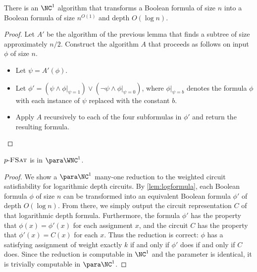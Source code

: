 
\begin{lemma}\label{lem:logformula}
  There is an $\NC^1$ algorithm that transforms a Boolean formula of size $n$ into a Boolean formula of size $n^{O(1)}$ and depth $O(\log n)$.
\end{lemma}
\begin{proof}
  Let $A'$ be the algorithm of the previous lemma that finds a subtree of size approximately $n / 2$.
  Construct the algorithm $A$ that proceeds as follows on input $\phi$ of size $n$.
  \begin{itemize}
  \item Let $\psi = A'(\phi)$.
  \item Let $\phi' = (\psi \land \phi|_{\psi = 1}) \lor (\lnot \psi \land \phi|_{\psi = 0})$, where $\phi|_{\psi = b}$ denotes the formula $\phi$ with each instance of $\psi$ replaced with the constant $b$.
  \item Apply $A$ recursively to each of the four subformulas in $\phi'$ and return the resulting formula.
  \end{itemize}
\end{proof}

\begin{lemma}\label{lem:pfsatmem}
  $p \textnormal{-} \textsc{FSat}$ is in $\para \WNC^1$.
\end{lemma}
\begin{proof}
  We show a $\para \NC^1$ many-one reduction to the weighted circuit satisfiability for logarithmic depth circuits.
  By \autoref{lem:logformula}, each Boolean formula $\phi$ of size $n$ can be transformed into an equivalent Boolean formula $\phi'$ of depth $O(\log n)$.
  From there, we simply output the circuit representation $C$ of that logarithmic depth formula.
  Furthermore, the formula $\phi'$ has the property that $\phi(x) = \phi'(x)$ for each assignment $x$, and the circuit $C$ has the property that $\phi'(x) = C(x)$ for each $x$.
  Thus the reduction is correct: $\phi$ has a satisfying assignment of weight exactly $k$ if and only if $\phi'$ does if and only if $C$ does.
  Since the reduction is computable in $\NC^1$ and the parameter is identical, it is trivially computable in $\para \NC^1$.
\end{proof}

